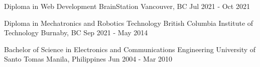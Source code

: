 
\begin{cventries}
  \cventry
    {Diploma in Web Development} %
    {BrainStation} %
    {Vancouver, BC} %
    {Jul 2021 - Oct 2021} %
    {
    }

  \cventry
    {Diploma in Mechatronics and Robotics Technology} %
    {British Columbia Institute of Technology} %
    {Burnaby, BC} %
    {Sep 2021 - May 2014} %
    {}

  \cventry
    {Bachelor of Science in Electronics and Communications Engineering} %
    {University of Santo Tomas} %
    {Manila, Philippines} %
    {Jun 2004 - Mar 2010} %
    {}
    
\end{cventries}
